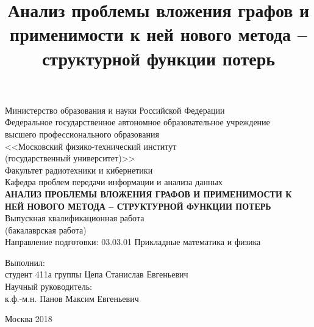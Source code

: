 \documentclass[12pt,a4paper]{extarticle}
\title{Анализ проблемы вложения графов и применимости к ней нового метода -- структурной функции потерь}
\begin{document}
    \begin{titlepage}
        \clearpage
        \pagestyle{empty}

        \begin{center}
            \textrm{Министерство образования и науки Российской Федерации}
            \\[5mm]
            Федеральное государственное автономное образовательное учреждение\\
            высшего профессионального образования\\
            <<Московский физико-технический институт\\
            {(государственный университет)}>>\\[5mm]
            Факультет радиотехники и кибернетики\\[5mm]
            Кафедра проблем передачи информации и анализа данных\\[50mm]
            \textbf{АНАЛИЗ ПРОБЛЕМЫ ВЛОЖЕНИЯ ГРАФОВ И ПРИМЕНИМОСТИ К НЕЙ НОВОГО МЕТОДА -- СТРУКТУРНОЙ ФУНКЦИИ ПОТЕРЬ}
            \\[8mm]
            \textrm{Выпускная квалификационная работа}
            \\
            (бакалаврская работа)\\[7mm]

            Направление подготовки: 03.03.01 Прикладные математика и физика\\[40mm]
        \end{center}

        \noindent Выполнил:\\
        студент 411а группы \hspace{0.9cm} \underline{\hspace{4cm}} Цепа Станислав Евгеньевич\\[2mm]

        \noindent Научный руководитель:\\
        к.ф.-м.н. \hspace{3.1cm} \underline{\hspace{4cm}} Панов Максим Евгеньевич
        \\[20mm]

        \begin{center}
            Москва 2018
        \end{center}

    \end{titlepage}

    \setcounter{page}{2}
\end{document}
